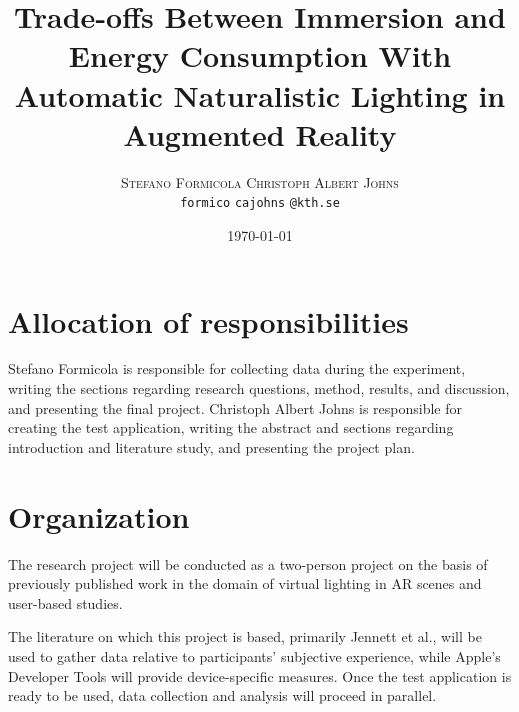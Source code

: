 \documentclass[12pt,twoside,english]{article}
\title{Trade-offs Between Immersion and Energy Consumption With Automatic Naturalistic Lighting in Augmented Reality}
\author{
        \textsc{Stefano Formicola}
            \qquad
        \textsc{Christoph Albert Johns}
        \mbox{}\\
        \normalsize
            \texttt{formico}
        \textbar{}
            \texttt{cajohns}
        \normalsize
            \texttt{@kth.se}
}
\date{\today}
\begin{document}
\maketitle






\section{Allocation of responsibilities}
\label{sect:alloc_responsibilities}

Stefano Formicola is responsible for collecting data during the experiment, writing the sections regarding research questions, method, results, and discussion, and presenting the final project.
Christoph Albert Johns is responsible for creating the test application, writing the abstract and sections regarding introduction and literature study, and presenting the project plan.


\section{Organization}
\label{sect:organization}

The research project will be conducted as a two-person project on the basis of previously published work in the domain of virtual lighting in \gls{AR} scenes and user-based studies.

The literature on which this project is based, primarily Jennett et al.\cite{jennett_measuring_2008}, will be used to gather data relative to participants' subjective experience, while Apple's Developer Tools will provide device-specific measures.
Once the test application is ready to be used, data collection and analysis will proceed in parallel.
\end{document}
